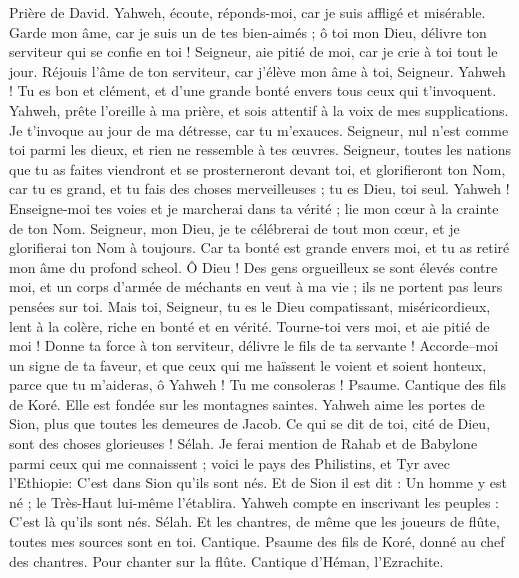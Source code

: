\begin{multicols}{2}
\VerseOne{}Prière de David. Yahweh, écoute, réponds-moi, car je suis affligé et misérable.
Garde mon âme, car je suis un de tes bien-aimés ; ô toi mon Dieu, délivre ton serviteur qui se confie en toi !
Seigneur, aie pitié de moi, car je crie à toi tout le jour.
Réjouis l'âme de ton serviteur, car j'élève mon âme à toi, Seigneur.
Yahweh ! Tu es bon et clément, et d'une grande bonté envers tous ceux qui t'invoquent.
Yahweh, prête l'oreille à ma prière, et sois attentif à la voix de mes supplications.
Je t'invoque au jour de ma détresse, car tu m'exauces.
Seigneur, nul n'est comme toi parmi les dieux, et rien ne ressemble à tes œuvres.
Seigneur, toutes les nations que tu as faites viendront et se prosterneront devant toi, et glorifieront ton Nom,
car tu es grand, et tu fais des choses merveilleuses ; tu es Dieu, toi seul.
Yahweh ! Enseigne-moi tes voies et je marcherai dans ta vérité ; lie mon cœur à la crainte de ton Nom.
Seigneur, mon Dieu, je te célébrerai de tout mon cœur, et je glorifierai ton Nom à toujours.
Car ta bonté est grande envers moi, et tu as retiré mon âme du profond scheol.
Ô Dieu ! Des gens orgueilleux se sont élevés contre moi, et un corps d'armée de méchants en veut à ma vie ; ils ne portent pas leurs pensées sur toi.
Mais toi, Seigneur, tu es le Dieu compatissant, miséricordieux, lent à la colère, riche en bonté et en vérité.
Tourne-toi vers moi, et aie pitié de moi ! Donne ta force à ton serviteur, délivre le fils de ta servante !
Accorde–moi un signe de ta faveur, et que ceux qui me haïssent le voient et soient honteux, parce que tu m'aideras, ô Yahweh ! Tu me consoleras !
\VerseOne{}Psaume. Cantique des fils de Koré. Elle est fondée sur les montagnes saintes.
Yahweh aime les portes de Sion, plus que toutes les demeures de Jacob.
Ce qui se dit de toi, cité de Dieu, sont des choses glorieuses ! Sélah.
Je ferai mention de Rahab et de Babylone parmi ceux qui me connaissent ; voici le pays des Philistins, et Tyr avec l'Ethiopie: C'est dans Sion qu'ils sont nés.
Et de Sion il est dit : Un homme y est né ; le Très-Haut lui-même l'établira.
Yahweh compte en inscrivant les peuples : C'est là qu'ils sont nés. Sélah.
Et les chantres, de même que les joueurs de flûte, toutes mes sources sont en toi.
\VerseOne{}Cantique. Psaume des fils de Koré, donné au chef des chantres. Pour chanter sur la flûte. Cantique d'Héman, l'Ezrachite.

\end{multicols}
